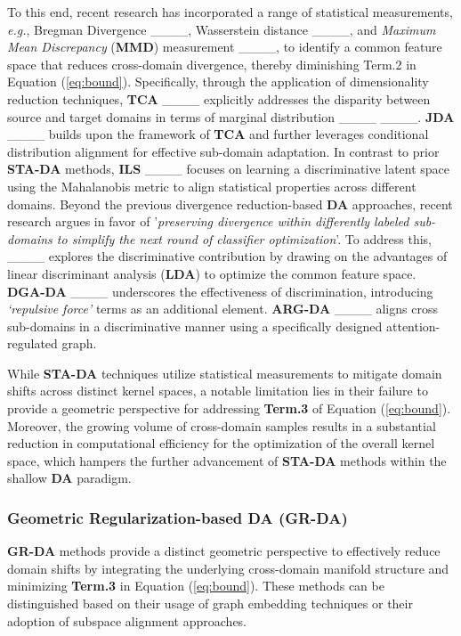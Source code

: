 To this end, recent research has incorporated a range of statistical measurements, \textit{e.g.}, Bregman Divergence ____, Wasserstein distance ____, and \textit{Maximum Mean Discrepancy} (\textbf{MMD}) measurement ____, to identify a common feature space that reduces cross-domain divergence, thereby diminishing Term.2 in Equation (\ref{eq:bound}). Specifically, through the application of dimensionality reduction techniques, \textbf{TCA} ____ explicitly addresses the disparity between source and target domains in terms of marginal distribution ____ ____. \textbf{JDA} ____ builds upon the framework of \textbf{TCA} and further leverages conditional distribution alignment for effective sub-domain adaptation. In contrast to prior \textbf{STA-DA} methods, \textbf{ILS} ____ focuses on learning a discriminative latent space using the Mahalanobis metric to align statistical properties across different domains. Beyond the previous divergence reduction-based \textbf{DA} approaches, recent research argues in favor of '\textit{preserving divergence within differently labeled sub-domains to simplify the next round of classifier optimization}'. To address this, ____ explores the discriminative contribution by drawing on the advantages of linear discriminant analysis (\textbf{LDA}) to optimize the common feature space. \textbf{DGA-DA} ____ underscores the effectiveness of discrimination, introducing \textit{‘repulsive force’} terms as an additional element. \textbf{ARG-DA} ____ aligns cross sub-domains in a discriminative manner using a specifically designed attention-regulated graph.





While \textbf{STA-DA} techniques utilize statistical measurements to mitigate domain shifts across distinct kernel spaces, a notable limitation lies in their failure to provide a geometric perspective for addressing \textbf{Term.3} of Equation (\ref{eq:bound}). Moreover, the growing volume of cross-domain samples results in a substantial reduction in computational efficiency for the optimization of the overall kernel space, which hampers the further advancement of \textbf{STA-DA} methods within the shallow \textbf{DA} paradigm.





\subsubsection{Geometric Regularization-based DA \textbf{(GR-DA)}} 
\label{Geometric alignment-based DA}
\textbf{GR-DA} methods provide a distinct geometric perspective to effectively reduce domain shifts by integrating the underlying cross-domain manifold structure and minimizing \textbf{Term.3} in Equation (\ref{eq:bound}). These methods can be distinguished based on their usage of graph embedding techniques or their adoption of subspace alignment approaches.





